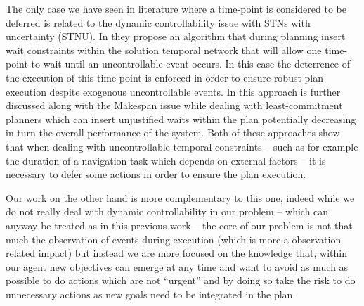 The only case we have seen in literature where a time-point is
considered to be deferred is related to the dynamic controllability
issue with STNs with uncertainty (STNU). In \cite{morris01} they propose 
an algorithm that during planning insert wait constraints within the
solution temporal network that will allow one time-point to wait until
an uncontrollable event occurs. In this case the deterrence of the
execution of this time-point is enforced in order to ensure robust plan
execution despite exogenous uncontrollable events. In
\cite{gallien2006}  this approach is further discussed along with the
Makespan issue while dealing with least-commitment planners which can
insert unjustified waits within the plan potentially decreasing in turn the
overall performance of the system. Both of these approaches show that
when dealing with uncontrollable temporal constraints -- such as for
example the duration of a navigation task which depends on external
factors -- it is necessary to defer some actions in order to ensure
the plan execution. 

Our work on the other hand is more complementary to this one, indeed
while we do not really deal with dynamic controllability in our
problem -- which can anyway be treated as in this previous work -- the
core of our problem is not that much the observation of events during
execution (which is more a observation related impact) but instead we
are more focused on the knowledge that, within our agent new
objectives can emerge at any time and want to avoid as much as
possible to do actions which are not ``urgent'' and by doing so take
the risk to do unnecessary actions as new goals need to be integrated
in the plan.



